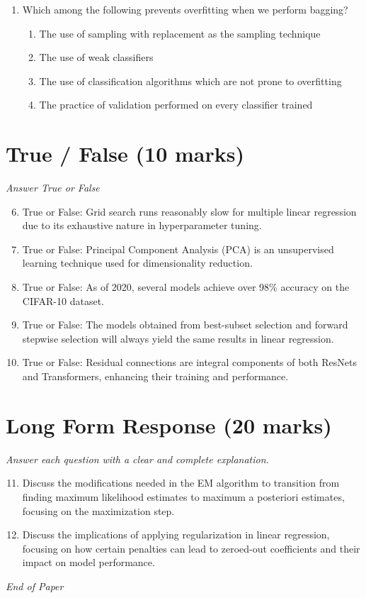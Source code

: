 \documentclass[12pt]{article}
\begin{document}
\begin{enumerate}[label=\arabic*.]
\begin{enumerate}[label=(\alph*)]
    \item Same variance
    \item None of the above
\end{enumerate}
\item Which among the following prevents overfitting when we perform bagging?
\begin{enumerate}[label=(\alph*)]
    \item The use of sampling with replacement as the sampling technique
    \item The use of weak classifiers
    \item The use of classification algorithms which are not prone to overfitting
    \item The practice of validation performed on every classifier trained
\end{enumerate}
\end{enumerate}

\section*{True / False (10 marks)}
\textit{Answer True or False}
\begin{enumerate}[label=\arabic*.]
\setcounter{enumi}{5}
\item True or False: Grid search runs reasonably slow for multiple linear regression due to its exhaustive nature in hyperparameter tuning.
\item True or False: Principal Component Analysis (PCA) is an unsupervised learning technique used for dimensionality reduction.
\item True or False: As of 2020, several models achieve over 98\% accuracy on the CIFAR-10 dataset.
\item True or False: The models obtained from best-subset selection and forward stepwise selection will always yield the same results in linear regression.
\item True or False: Residual connections are integral components of both ResNets and Transformers, enhancing their training and performance.
\end{enumerate}

\section*{Long Form Response (20 marks)}
\textit{Answer each question with a clear and complete explanation.}
\begin{enumerate}[label=\arabic*.]
\setcounter{enumi}{10}
\item Discuss the modifications needed in the EM algorithm to transition from finding maximum likelihood estimates to maximum a posteriori estimates, focusing on the maximization step.
\item Discuss the implications of applying regularization in linear regression, focusing on how certain penalties can lead to zeroed-out coefficients and their impact on model performance.
\end{enumerate}

\vfill
\noindent\textit{End of Paper}
\end{document}
